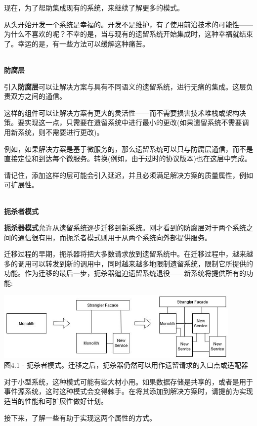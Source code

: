 现在，为了帮助集成现有的系统，来继续了解更多的模式。


从头开始开发一个系统是幸福的。开发不是维护，有了使用前沿技术的可能性——为什么不喜欢的呢？不幸的是，当与现有的遗留系统开始集成时，这种幸福就结束了。幸运的是，有一些方法可以缓解这种痛苦。

\hspace*{\fill} \\ %
\noindent
\textbf{防腐层}

引入\textbf{防腐层}可以让解决方案与具有不同语义的遗留系统，进行无痛的集成。这层负责双方之间的通信。

这样的组件可以让解决方案有更大的灵活性——而不需要损害技术堆栈或架构决策。要实现这一点，只需要在遗留系统中进行最小的更改(如果遗留系统不需要调用新系统，则不需要进行更改)。

例如，如果解决方案是基于微服务的，那么遗留系统可以只与防腐层通信，而不是直接定位和到达每个微服务。转换(例如，由于过时的协议版本)也在这层中完成。

请记住，添加这样的层可能会引入延迟，并且必须满足解决方案的质量属性，例如可扩展性。

\hspace*{\fill} \\ %
\noindent
\textbf{扼杀者模式}

\textbf{扼杀器模式}允许从遗留系统逐步迁移到新系统。刚才看到的防腐层对于两个系统之间的通信很有用，而扼杀者模式则用于从两个系统向外部提供服务。

迁移过程的早期，扼杀器将把大多数请求放到遗留系统中。在迁移过程中，越来越多的调用可以转发到新的调用中，同时越来越多地限制遗留系统，限制它所提供的功能。作为迁移的最后一步，扼杀器逼迫遗留系统退役——新系统将提供所有的功能:

\begin{center}
\includegraphics[width=0.9\textwidth]{content/2/chapter4/images/1.jpg}\\
图4.1 - 扼杀者模式。迁移之后，扼杀器仍然可以用作遗留请求的入口点或适配器
\end{center}

对于小型系统，这种模式可能有些大材小用。如果数据存储是共享的，或者是用于事件源系统，这时这种模式会变得棘手。在将其添加到解决方案时，请提前为实现适当的性能和可扩展性做好计划。

接下来，了解一些有助于实现这两个属性的方式。















